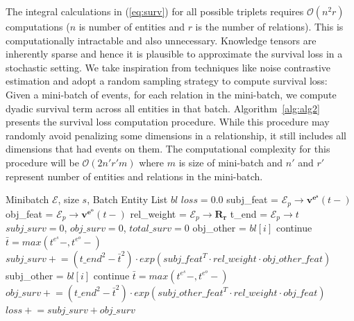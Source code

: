 \documentclass{article}
\begin{document}
The integral calculations in (\ref{eq:surv}) for all possible triplets requires $\mathcal{O}(n^2r)$ computations ($n$ is number of entities and $r$ is the number of relations). This is computationally intractable and also unnecessary. Knowledge tensors are inherently sparse and hence it is plausible to approximate the survival loss in a stochastic setting.
We take inspiration from techniques like noise contrastive \citep{GutHyv12} estimation and adopt a random sampling strategy to compute survival loss: Given a mini-batch of events, for each relation in the mini-batch, we compute dyadic survival term across all entities in that batch. Algorithm~\ref{alg:alg2} presents the survival loss computation procedure. While this procedure may randomly avoid penalizing some dimensions in a relationship, it still includes all dimensions that had events on them. The computational complexity for this procedure will be $\mathcal{O}(2n'r'm)$ where $m$ is size of mini-batch and $n'$ and $r'$ represent number of entities and relations in the mini-batch.
\vspace{-0.5cm}
\setlength{\textfloatsep}{0.2cm}
\begin{algorithm}[t]
   \caption{Survival Loss Computation in mini-batch}
   \label{alg:alg2}
\begin{algorithmic}
    Mini\-batch $\mathcal{E}$, size $s$, Batch Entity List $bl$
   \STATE $loss=0.0$
   \STATE subj\_feat = $\mathcal{E}_p \rightarrow \mathbf{v^{e^s}}(t-)$
   \STATE obj\_feat = $\mathcal{E}_p \rightarrow \mathbf{v^{e^o}}(t-)$
   \STATE rel\_weight = $\mathcal{E}_p \rightarrow \mathbf{R_r}$
   \STATE t\_end = $\mathcal{E}_p \rightarrow t$
   \STATE $subj\_surv = 0$, $obj\_surv = 0$, $total\_surv = 0$
   \STATE obj\_other = $bl[i]$
   \STATE continue
   \ENDIF
   \STATE $\bar{t} = max(t^{e^s}-,t^{e^o}-)$
   \STATE $subj\_surv \mathrel{+}= (t\_end^2 - \bar{t}^2) \cdot exp(subj\_feat^T\cdot rel\_weight \cdot obj\_other\_feat)$
   \ENDFOR
   \STATE subj\_other = $bl[i]$
   \STATE continue
   \ENDIF
   \STATE $\bar{t} = max(t^{e^s}-,t^{e^o}-)$
   \STATE $obj\_surv \mathrel{+}= (t\_end^2 - \bar{t}^2) \cdot exp(subj\_other\_feat^T\cdot rel\_weight \cdot obj\_feat)$
   \ENDFOR
   \STATE $loss \mathrel{+}= subj\_surv + obj\_surv$
   \ENDFOR
\end{algorithmic}
\end{algorithm}
\end{document}
